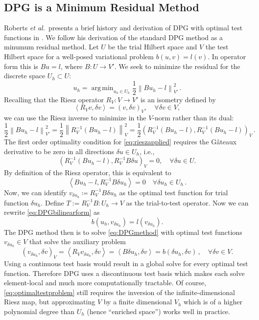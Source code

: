 \documentclass[letterpaper]{article}
\DeclareMathOperator*{\argmin}{\arg\,\min}
\newcommand{\eqnref}[1]{\eqref{eq:#1}}
\newcommand{\norm}[1]{\left\| #1 \right\|}
\newcommand{\LRp}[1]{\left( #1 \right)}
\newcommand{\LRa}[1]{\left\langle #1 \right\rangle}
\def\etal{{\it et al.~}}
\begin{document}
\subsection{DPG is a Minimum Residual Method}
Roberts \etal presents a brief history and derivation of DPG with optimal test functions in
\cite{DPGStokes}. We follow his derivation of the standard DPG method as a
minumum residual method. Let $U$ be the trial Hilbert space and $V$ the test
Hilbert space for a well-posed variational problem $b(u,v)=l(v)$. In operator
form this is $Bu=l$, where $B:U\rightarrow V'$. We seek to minimize the
residual for the discrete space $U_h\subset U$:
\begin{equation}
u_h=\argmin_{u_h\in U_h}\frac{1}{2}\norm{Bu_h-l}^2_{V'}\,.
\label{minresidual}
\end{equation}
Recalling that the Riesz operator $R_V:V\rightarrow V'$ is an isometry defined
by
\[
\LRa{R_Vv,\delta v}=\LRp{v,\delta v}_V,\quad\forall\delta v\in V,
\]
we can use the Riesz inverse to minimize in the $V$-norm rather than its dual:
\begin{equation}
\frac{1}{2}\norm{Bu_h-l}^2_{V'}=\frac{1}{2}\norm{R_V^{-1}(Bu_h-l)}^2_V
=\frac{1}{2}\LRp{R_V^{-1}(Bu_h-l),R_V^{-1}(Bu_h-l)}_V\,.
\label{eq:rieszapplied}
\end{equation}
The first order optimality condition for \eqnref{rieszapplied} requires
the G\^ateaux derivative to be zero in all directions $\delta u \in
U_h$, i.e.,
\[
\left(R_V^{-1}(Bu_h-l),R_V^{-1}B\delta u\right)_V = 0, \quad \forall \delta u \in U. 
\]
By definition of the Riesz operator, this is equivalent to
\begin{equation}
\LRa{Bu_h-l,R_V^{-1}B\delta u_h}=0\quad\forall\delta u_h\in U_h\,.
\label{eq:DPGbilinearform}
\end{equation}
Now, we can identify $v_{\delta u_h}\coloneqq R_V^{-1}B\delta u_h$ as the
optimal test function for trial function $\delta u_h$. Define $T:=R_V^{-1}B:U_h\rightarrow V$ as the trial-to-test operator. Now we can rewrite
\eqnref{DPGbilinearform} as
\begin{equation}
b(u_h,v_{\delta u_h})=l(v_{\delta u_h}).
\label{eq:DPGmethod}
\end{equation}
The DPG method then is to solve \eqnref{DPGmethod} with optimal test functions
$v_{\delta u_h}\in V$ that solve the auxiliary problem
\begin{equation}
\LRp{v_{\delta u_h},\delta v}_V=\LRa{R_Vv_{\delta u_h},\delta v}
=\LRa{B\delta u_h,\delta v}=b(\delta u_h,\delta v)\,,\quad\forall\delta v\in V.
\label{eq:optimaltestproblem}
\end{equation}
Using a continuous test basis would result in a global solve for every optimal
test function. Therefore DPG uses a discontinuous test basis which makes each
solve element-local and much more computationally tractable. Of course,
\eqnref{optimaltestproblem} still requires the inversion of the
infinite-dimensional Riesz map, but approximating $V$ by a finite
dimensional $V_h$ which is of a higher polynomial degree than $U_h$ (hence
``enriched space'') works well in practice.
\end{document}
